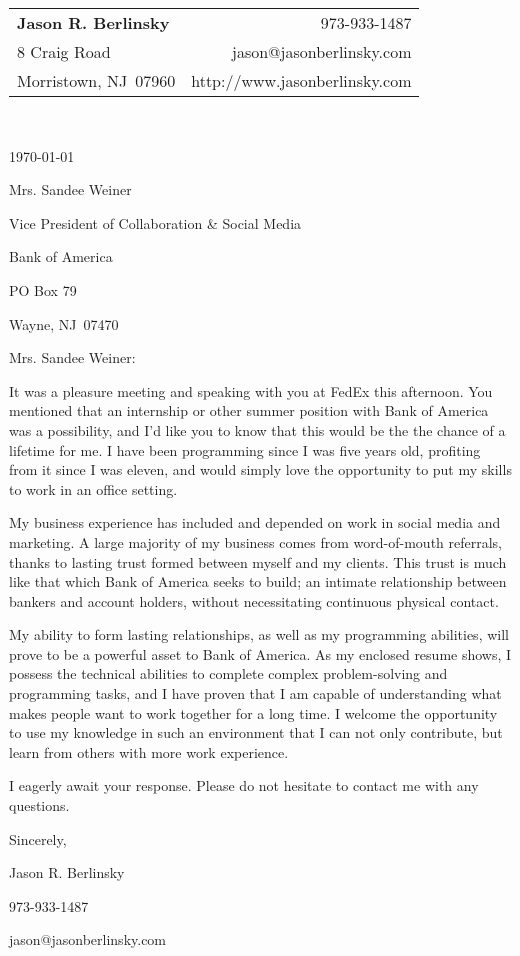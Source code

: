 \documentclass[letterpaper,11pt]{article}
\makeatletter
\newcommand{\myname}[0]{Jason R. Berlinsky}
\newcommand{\myphone}[0]{973-933-1487}
\newcommand{\myemail}[0]{jason@jasonberlinsky.com}
\newcommand{\myaddress}[0]{8 Craig Road}
\newcommand{\mycity}[0]{Morristown}
\newcommand{\mystate}[0]{NJ}
\newcommand{\myzip}[0]{07960}
\newcommand{\myurl}[0]{http://www.jasonberlinsky.com}
\newcommand{\recipient}[0]{Mrs. Sandee Weiner}
\newcommand{\recipienttitle}[0]{Vice President of Collaboration \& Social Media}
\newcommand{\company}[0]{Bank of America}
\newcommand{\companyaddress}[0]{PO Box 79}
\newcommand{\companycity}[0]{Wayne}
\newcommand{\companystate}[0]{NJ}
\newcommand{\companyzip}[0]{07470}
\makeatother
\begin{document}
\begin{tabular*}{8in}{l@{\extracolsep{\fill}}r}
\textbf{\Large \myname}  & \myphone\\
\myaddress &  \myemail \\
\mycity, \mystate \ \myzip & \myurl\\
\end{tabular*}
\\

\vspace{0.75in}

\today

\recipient

\recipienttitle

\company

\companyaddress

\companycity, \companystate \ \companyzip


\vspace{0.3in}


\recipient:
\vspace{0.2in}

It was a pleasure meeting and speaking with you at FedEx this afternoon. You mentioned that an internship or other summer position with Bank of America was a possibility, and I'd like you to know that this would be the the chance of a lifetime for me. I have been programming since I was five years old, profiting from it since I was eleven, and would simply love the opportunity to put my skills to work in an office setting.

\vspace{0.15in}
My business experience has included and depended on work in social media and marketing. A large majority of my business comes from word-of-mouth referrals, thanks to lasting trust formed between myself and my clients. This trust is much like that which Bank of America seeks to build; an intimate relationship between bankers and account holders, without necessitating continuous physical contact.

\vspace{0.15in}
My ability to form lasting relationships, as well as my programming abilities, will prove to be a powerful asset to Bank of America. As my enclosed resume shows, I possess the technical abilities to complete complex problem-solving and programming tasks, and I have proven that I am capable of understanding what makes people want to work together for a long time. I welcome the opportunity to use my knowledge in such an environment that I can not only contribute, but learn from others with more work experience.

\vspace{0.15in}
I eagerly await your response. Please do not hesitate to contact me with any questions.

\vspace{0.15in}
\vspace{0.2in}
Sincerely,

\vspace{0.75in}
\myname

\myphone

\myemail
\end{document}
